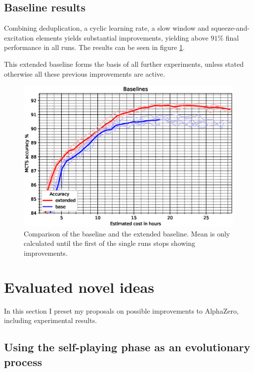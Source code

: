\documentclass[12pt,onecolumn,oneside,titlepage]{article}
\begin{document}
\subsection{Baseline results}

Combining deduplication, a cyclic learning rate, a slow window and squeeze-and-excitation elements yields substantial improvements, yielding above $91\%$ final performance in all runs. The results can be seen in figure \ref{fig:baseline_compare}.

This extended baseline forms the basis of all further experiments, unless stated otherwise all these previous improvements are active.

\begin{figure}[H]
\centering
\includegraphics[clip,width=\columnwidth]{baselines}
\caption{Comparison of the baseline and the extended baseline. Mean is only calculated until the first of the single runs stops showing improvements.}
\label{fig:baseline_compare}
\end{figure}


\section{Evaluated novel ideas}

In this section I preset my proposals on possible improvements to AlphaZero, including experimental results.


\subsection{Using the self-playing phase as an evolutionary process} \label{s:novel_evolution}
\end{document}
